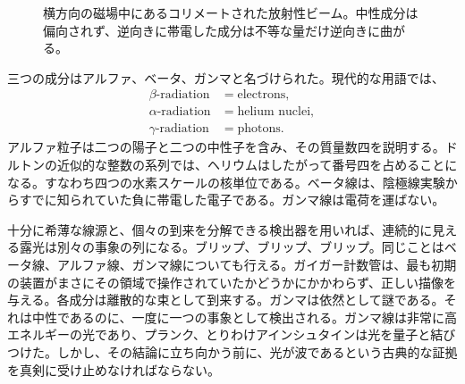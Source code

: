 \begin{figure}[h]
\centering
{}
\caption{横方向の磁場中にあるコリメートされた放射性ビーム。中性成分は偏向されず、逆向きに帯電した成分は不等な量だけ逆向きに曲がる。}
\end{figure}

三つの成分はアルファ、ベータ、ガンマと名づけられた。現代的な用語では、
\begin{equation}
\begin{aligned}
\beta\text{-radiation} &= \text{electrons},\\
\alpha\text{-radiation} &= \text{helium nuclei},\\
\gamma\text{-radiation} &= \text{photons}.
\end{aligned}
\end{equation}
アルファ粒子は二つの陽子と二つの中性子を含み、その質量数四を説明する。ドルトンの近似的な整数の系列では、ヘリウムはしたがって番号四を占めることになる。すなわち四つの水素スケールの核単位である。ベータ線は、陰極線実験からすでに知られていた負に帯電した電子である。ガンマ線は電荷を運ばない。

十分に希薄な線源と、個々の到来を分解できる検出器を用いれば、連続的に見える露光は別々の事象の列になる。ブリップ、ブリップ、ブリップ。同じことはベータ線、アルファ線、ガンマ線についても行える。ガイガー計数管は、最も初期の装置がまさにその領域で操作されていたかどうかにかかわらず、正しい描像を与える。各成分は離散的な束として到来する。ガンマは依然として謎である。それは中性であるのに、一度に一つの事象として検出される。ガンマ線は非常に高エネルギーの光であり、プランク、とりわけアインシュタインは光を量子と結びつけた。しかし、その結論に立ち向かう前に、光が波であるという古典的な証拠を真剣に受け止めなければならない。

